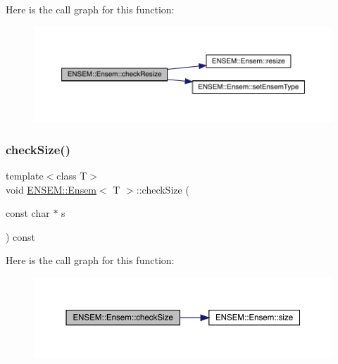 Here is the call graph for this function\+:
\nopagebreak
\begin{figure}[H]
\begin{center}
\leavevmode
\includegraphics[width=350pt]{d7/d3e/classENSEM_1_1Ensem_a893d2925ef3c942b9d25b0a6e6db619c_cgraph}
\end{center}
\end{figure}
\mbox{\label{classENSEM_1_1Ensem_a32978c0e251d9731bdb83c6069eb059d}} 
\subsubsection{\texorpdfstring{checkSize()}{checkSize()}\hspace{0.1cm}{\footnotesize\ttfamily [1/6]}}
{\footnotesize\ttfamily template$<$class T$>$ \\
void \mbox{\hyperlink{classENSEM_1_1Ensem}{E\+N\+S\+E\+M\+::\+Ensem}}$<$ T $>$\+::check\+Size (\begin{DoxyParamCaption}\item[{const char $\ast$}]{s }\end{DoxyParamCaption}) const\hspace{0.3cm}{\ttfamily [inline]}}

Here is the call graph for this function\+:
\nopagebreak
\begin{figure}[H]
\begin{center}
\leavevmode
\includegraphics[width=350pt]{d7/d3e/classENSEM_1_1Ensem_a32978c0e251d9731bdb83c6069eb059d_cgraph}
\end{center}
\end{figure}
\mbox{\label{classENSEM_1_1Ensem_a32978c0e251d9731bdb83c6069eb059d}} 
